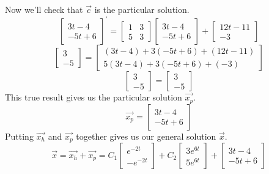 Now we'll check that $\vec{c}$ is the particular solution.
\begin{equation*}
	\begin{bmatrix}
		3t-4 \\
		-5t+6
	\end{bmatrix}^\prime = \begin{bmatrix}
		1 & 3 \\
		5 & 3
	\end{bmatrix} \begin{bmatrix}
		3t - 4 \\
		-5t + 6
	\end{bmatrix} + \begin{bmatrix}
		12t - 11 \\
		-3
	\end{bmatrix}
\end{equation*}
\begin{equation*}
	\begin{bmatrix}
		3 \\
		-5
	\end{bmatrix} = \begin{bmatrix}
		(3t-4) + 3(-5t+6) + (12t-11) \\
		5(3t-4) + 3(-5t+6) + (-3)
	\end{bmatrix}
\end{equation*}
\begin{equation*}
	\begin{bmatrix}
		3 \\
		-5
	\end{bmatrix} = \begin{bmatrix}
		3 \\
		-5
	\end{bmatrix}
\end{equation*}
This true result gives us the particular solution $\vec{x_p}$.
\begin{equation*}
	\vec{x_p} = \begin{bmatrix}
		3t - 4 \\
		-5t + 6
	\end{bmatrix}
\end{equation*}
Putting $\vec{x_h}$ and $\vec{x_p}$ together gives us our general solution $\vec{x}$.
\begin{equation*}
	\vec{x} = \vec{x_h} + \vec{x_p} = C_1\begin{bmatrix}
		e^{-2t} \\
		-e^{-2t}
	\end{bmatrix} + C_2\begin{bmatrix}
		3e^{6t} \\
		5e^{6t}
	\end{bmatrix} + \begin{bmatrix}
		3t - 4 \\
		-5t + 6
	\end{bmatrix}
\end{equation*}